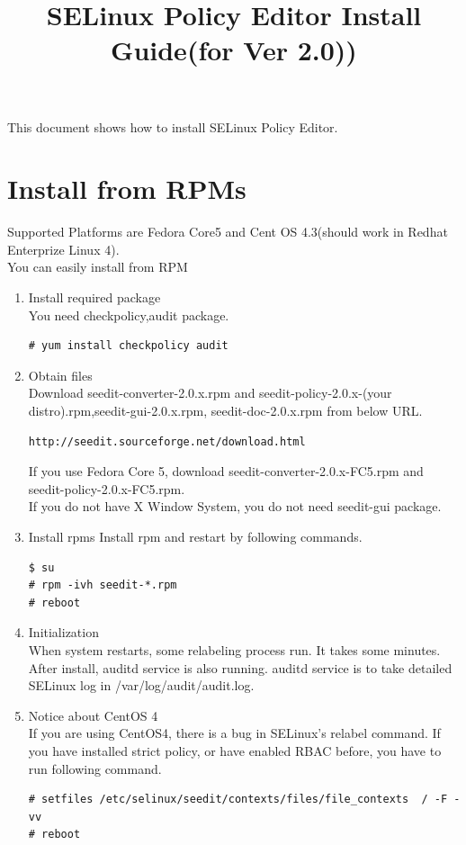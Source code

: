\documentclass{article}
\title{SELinux Policy Editor Install Guide(for Ver 2.0))}
\begin{document}
\def\labelenumi{(\theenumi)}
\maketitle
\tableofcontents
\newpage

This document shows how to install SELinux Policy Editor.

\section{Install from RPMs}\label{sec:rpm}
Supported Platforms are Fedora Core5 and Cent OS 4.3(should work in Redhat
Enterprize Linux 4).\\

You can easily install from RPM
\begin{enumerate}
 \item Install required package\\
       You need checkpolicy,audit package.
\begin{verbatim}
# yum install checkpolicy audit
\end{verbatim}

    \item Obtain files\\
Download seedit-converter-2.0.x.rpm and seedit-policy-2.0.x-(your
	  distro).rpm,seedit-gui-2.0.x.rpm, seedit-doc-2.0.x.rpm 
from below URL.
\begin{verbatim}
http://seedit.sourceforge.net/download.html
\end{verbatim}
If you use Fedora Core 5, download seedit-converter-2.0.x-FC5.rpm and
       seedit-policy-2.0.x-FC5.rpm.\\
If you do not have X Window System, you do not need seedit-gui package.

 \item Install rpms
Install rpm and restart by following commands.
\begin{verbatim}
$ su 
# rpm -ivh seedit-*.rpm
# reboot
\end{verbatim}
 \item Initialization\\ \label{item:init}
When system restarts, some relabeling process run. It takes some
	  minutes. \\
After install, auditd service is also running. auditd service is to take
     detailed  SELinux log in /var/log/audit/audit.log.


\item Notice about CentOS 4\\ 
If you are using CentOS4, there is a bug in SELinux's relabel command.
If you have installed strict policy, or have enabled RBAC before, 
you have to run following command.
\begin{verbatim}
# setfiles /etc/selinux/seedit/contexts/files/file_contexts  / -F -vv
# reboot
\end{verbatim}


\end{enumerate}
\end{document}
